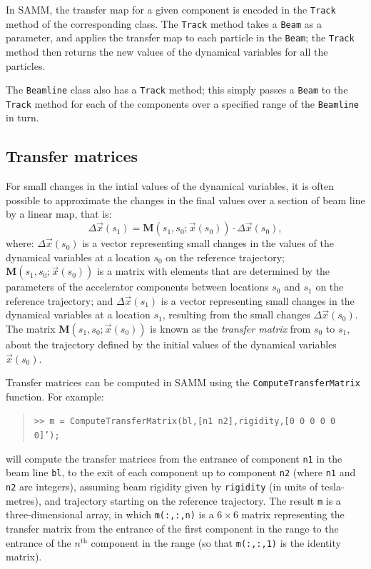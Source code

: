 \documentclass[11pt,twoside,a4paper]{article}
\begin{document}
In SAMM, the transfer map for a given component is encoded in the
\texttt{Track} method of the corresponding class.  The \texttt{Track} method
takes a \texttt{Beam} as a parameter, and applies the transfer map to each
particle in the \texttt{Beam}; the \texttt{Track} method then returns the new
values of the dynamical variables for all the particles.

The \texttt{Beamline} class also has a \texttt{Track} method; this simply
passes a \texttt{Beam} to the \texttt{Track} method for each of the components
over a specified range of the \texttt{Beamline} in turn.

\subsection{Transfer matrices}
For small changes in the intial values of the dynamical variables, it is often
possible to approximate the changes in the final values over a section of
beam line by a linear map, that is:
\[
\Delta \vec{x}(s_1) = \mathbf{M}(s_1,s_0;\vec{x}(s_0)) \cdot \Delta \vec{x}(s_0),
\]
where: $\Delta \vec{x}(s_0)$ is a vector representing small changes in the values
of the dynamical variables at a location $s_0$ on the reference trajectory;
$\mathbf{M}(s_1,s_0;\vec{x}(s_0))$ is a matrix with elements that are determined by the
parameters of the accelerator components between locations $s_0$ and $s_1$ on
the reference trajectory; and $\Delta \vec{x}(s_1)$ is a vector representing
small changes in the dynamical variables at a location $s_1$, resulting from
the small changes $\Delta \vec{x}(s_0)$.  The matrix $\mathbf{M}(s_1,s_0;\vec{x}(s_0))$
is known as the \emph{transfer matrix} from $s_0$ to $s_1$, about the
trajectory defined by the initial values of the dynamical variables $\vec{x}(s_0)$.

Transfer matrices can be computed in SAMM using the \texttt{ComputeTransferMatrix}
function.  For example:
\begin{quote}
\texttt{>> m = ComputeTransferMatrix(bl,[n1 n2],rigidity,[0 0 0 0 0 0]');}
\end{quote}
will compute the transfer matrices from the entrance of component \texttt{n1} in
the beam line \texttt{bl}, to the exit of each component up to component \texttt{n2}
(where \texttt{n1} and \texttt{n2} are integers), assuming beam rigidity given by \texttt{rigidity} (in units of tesla-metres), and trajectory starting on the
reference trajectory.  The result \texttt{m} is a three-dimensional array, in which
\texttt{m(:,:,n)} is a $6\times 6$ matrix representing the transfer matrix
from the entrance of the first component in the range to the entrance of
the $n^\textrm{th}$ component in the range (so that \texttt{m(:,:,1)} is the
identity matrix).
\end{document}
